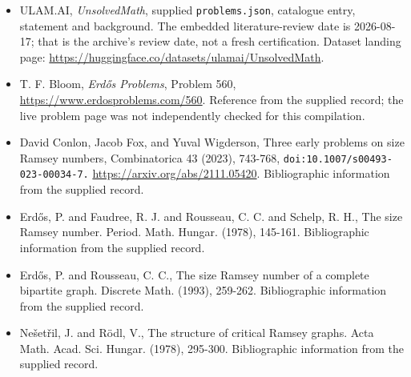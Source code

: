 \documentclass[11pt,a4paper]{article}
\begin{document}
{\small

\begin{itemize}

\item[\hypertarget{source:statement:1}{S1}] ULAM.AI, \emph{UnsolvedMath}, supplied \texttt{problems.json}, catalogue entry, statement and background. The embedded literature-review date is 2026-08-17; that is the archive’s review date, not a fresh certification. Dataset landing page: \url{https://huggingface.co/datasets/ulamai/UnsolvedMath}.

\item[\hypertarget{source:statement:2}{S2}] T. F. Bloom, \emph{Erdős Problems}, Problem 560, \url{https://www.erdosproblems.com/560}. Reference from the supplied record; the live problem page was not independently checked for this compilation.

\item[\hypertarget{source:statement:3}{S3}] David Conlon, Jacob Fox, and Yuval Wigderson, Three early problems on size Ramsey numbers, Combinatorica 43 (2023), 743-768, \nolinkurl{doi:10.1007/s00493-023-00034-7.} \url{https://arxiv.org/abs/2111.05420}. Bibliographic information from the supplied record.

\item[\hypertarget{source:statement:4}{S4}] Erd\H{o}s, P. and Faudree, R. J. and Rousseau, C. C. and Schelp, R. H., The size Ramsey number. Period. Math. Hungar. (1978), 145-161. Bibliographic information from the supplied record.

\item[\hypertarget{source:statement:5}{S5}] Erd\H{o}s, P. and Rousseau, C. C., The size Ramsey number of a complete bipartite graph. Discrete Math. (1993), 259-262. Bibliographic information from the supplied record.

\item[\hypertarget{source:statement:6}{S6}] Ne\v{s}et\v{r}il, J. and R\"{o}dl, V., The structure of critical Ramsey graphs. Acta Math. Acad. Sci. Hungar. (1978), 295-300. Bibliographic information from the supplied record.

\end{itemize}

}

\label{end:statement}
\end{document}
